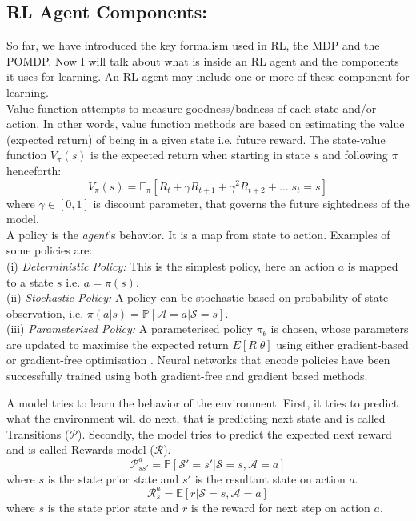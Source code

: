 \subsection*{RL Agent Components:}
So far, we have introduced the key formalism used in RL,
the MDP and the POMDP. Now I will talk about what is inside an RL agent and the components it uses for learning. An RL agent may include one or more of these component for learning.\\
Value function attempts to measure goodness/badness of each state and/or action.
In other words, value function methods are based on estimating the value
(expected return) of being in a given state i.e. future reward.
The state-value
function $V_{\pi}(s)$
 is the expected return when starting in state $s$
and following $\pi$ henceforth:
$$V_{\pi}(s) = \mathbb{E}_\pi [R_t +\gamma R_{t+1} + \gamma^2 R_{t+2}+\ldots  | s_t =s ]$$
where $\gamma \in [0,1]$ is discount parameter, that governs the future sightedness of the model.
\\
  A policy is the {\em agent}'s behavior. It is a map from state to action. Examples of some policies are: \\
(i) {\em Deterministic Policy:} This is the simplest policy, here an action $a$ is mapped to a state $s$ i.e. $a = \pi(s)$.\\
(ii) {\em Stochastic Policy:} A policy can be stochastic based on probability of state observation, i.e. $\pi(a|s) = \mathbb{P}[\mathcal{A}=a |  \mathcal{S} = s]$.\\
(iii) {\em Parameterized Policy:} A parameterised policy $\pi_\theta$ is chosen, whose
parameters are updated to maximise the expected return $E[R|\theta]$ using either gradient-based or gradient-free optimisation \cite{deisenroth2013survey}. Neural networks that encode policies have been successfully
trained using both gradient-free \cite{gomez2005evolving, cuccu2011intrinsically, koutnik2013evolving} and gradient based \cite{williams1992simple, lillicrap2015continuous, heess2015learning} methods.

A model tries to learn the behavior of the environment. First, it tries to predict what the environment will do next, that is predicting next state and is called Transitions ($\mathcal{P}$). Secondly, the model tries to predict the expected next reward and is called Rewards model ($\mathcal{R}$).
$$\mathcal{P}^a_{ss'} = \mathbb{P}[\mathcal{S}' =s'| \mathcal{S}=s, \mathcal{A} =a]$$
where $s$ is the state prior state and $s'$ is the resultant state on action $a$.
$$\mathcal{R}^a_s = \mathbb{E}[r|\mathcal{S}=s,\mathcal{A}=a]$$
where $s$ is the state prior state and $r$ is the reward for next step on action $a$.


